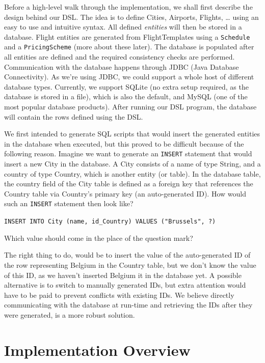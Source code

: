 \documentclass[a4paper]{article}
\newcommand{\cc}[1]{\texttt{#1}}
\begin{document}
Before a high-level walk through the implementation, we shall first describe the design behind our DSL.
The idea is to define Cities, Airports, Flights, \ldots{} using an easy to use and intuitive syntax.
All defined \emph{entities} will then be stored in a database.
Flight entities are generated from FlightTemplates using a \cc{Schedule} and a \cc{Pricing\-Scheme} (more about these later).
The database is populated after all entities are defined and the required consistency checks are performed.
Communication with the database happens through \textsc{JDBC} (Java Database Connectivity).
As we're using \textsc{JDBC}, we could support a whole host of different database types.
Currently, we support SQLite (no extra setup required, as the database is stored in a file), which is also the default, and MySQL (one of the most popular database products).
After running our DSL program, the database will contain the rows defined using the DSL\@.

We first intended to generate SQL scripts that would insert the generated entities in the database when executed, but this proved to be difficult because of the following reason.
Imagine we want to generate an \cc{INSERT} statement that would insert a new City in the database.
A City consists of a name of type String, and a country of type Country, which is another entity (or table).
In the database table, the country field of the City table is defined as a foreign key that references the Country table via Country's primary key (an auto-generated ID).
How would such an \cc{INSERT} statement then look like?

\cc{INSERT INTO City (name, id\_Country) VALUES ("Brussels", ?)}

Which value should come in the place of the question mark?

The right thing to do, would be to insert the value of the auto-generated ID of the row representing Belgium in the Country table, but we don't know the value of this ID, as we haven't inserted Belgium it in the database yet.
A possible alternative is to switch to manually generated IDs, but extra attention would have to be paid to prevent conflicts with existing IDs.
We believe directly communicating with the database at run-time and retrieving the IDs after they were generated, is a more robust solution.


\clearpage
\section{Implementation Overview}
\label{sec:implementation-overview}
\end{document}
